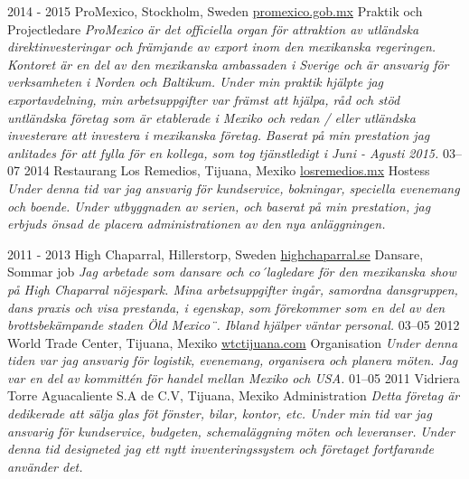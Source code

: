 \documentclass[]{friggeri-cv}
\begin{document}
\begin{entrylist}
  \bigentry
    {2014 - 2015}
    {ProMexico, Stockholm, Sweden \newline 
        {\href{http://www.promexico.gob.mx/en/mx/stockholm}{promexico.gob.mx}}}
    {Praktik och Projectledare}
    {\emph{ProMexico är det officiella organ för attraktion av utländska direktinvesteringar och främjande av export inom den mexikanska regeringen. Kontoret är en del av den mexikanska ambassaden i Sverige och är ansvarig för verksamheten i Norden och Baltikum. Under min praktik hjälpte jag exportavdelning, min arbetsuppgifter var främst att hjälpa, råd och stöd untländska företag som är etablerade i Mexiko och redan / eller utländska investerare att investera i mexikanska företag.}}
    {\textit{ Baserat på min prestation jag anlitades för att fylla för en kollega, som tog tjänstledigt i Juni - Agusti 2015.}}
  \bigentry
    {03–07 2014}
    {Restaurang Los Remedios, Tijuana, Mexiko \newline
        {\href{http://www.losremedios.mx/}{losremedios.mx}}}
    {Hostess}
    {\emph{Under denna tid var jag ansvarig för kundservice, bokningar, speciella evenemang och boende.}}
    {\textit{ Under utbyggnaden av serien, och baserat på min prestation, jag erbjuds önsad de placera administrationen av den nya anläggningen.}}

  \entry
    {2011 - 2013}
    {High Chaparral, Hillerstorp, Sweden \newline
        {\href{http://www.highchaparral.se/sv/}{highchaparral.se}}}
    {Dansare, Sommar job}
    {\emph{Jag arbetade som dansare och co´lagledare för den mexikanska show på High Chaparral nöjespark. Mina arbetsuppgifter ingår, samordna dansgruppen, dans praxis och visa prestanda, i egenskap, som förekommer som en del av den brottsbekämpande staden Öld Mexico¨. Ibland hjälper väntar personal.}}
  \entry
    {03–05 2012}
    {World Trade Center, Tijuana, Mexiko \newline
        {\href{http://www.wtctijuana.com/}{wtctijuana.com}}
    }
    {Organisation}
    {\emph{Under denna tiden var jag ansvarig för logistik, evenemang, organisera och planera möten. Jag var en del av kommittén för handel mellan Mexiko och USA.}}
  \bigentry
    {01–05 2011}
    {Vidriera Torre Aguacaliente S.A de C.V, Tijuana, Mexiko}
    {Administration}
    {\emph{Detta företag är dedikerade att sälja glas föt fönster, bilar, kontor, etc. Under min tid var jag ansvarig för kundservice, budgeten, schemaläggning möten och leveranser.}}
    {\textit{ Under denna tid designeted jag ett nytt inventeringssystem och företaget fortfarande använder det.}}
\end{entrylist}
\end{document}
